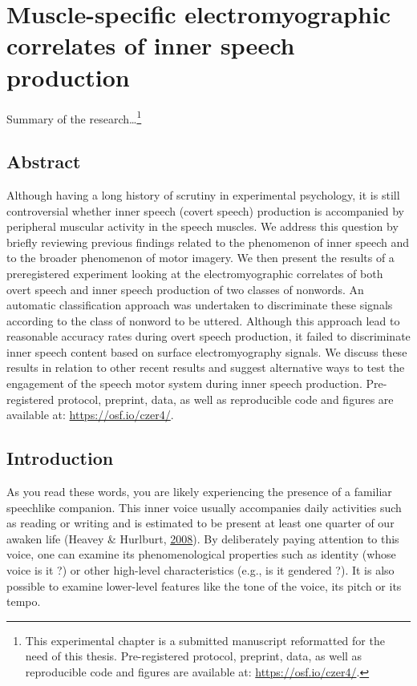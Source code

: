 \documentclass[a4paper,12pt,twoside,openright,oldfontcommands]{memoir}
\let\rmarkdownfootnote\footnote%
\def\footnote{\protect\rmarkdownfootnote}
\begin{document}
\hypertarget{muscle-specific-electromyographic-correlates-of-inner-speech-production}{%
\chapter{Muscle-specific electromyographic correlates of inner speech production}\label{muscle-specific-electromyographic-correlates-of-inner-speech-production}}

Summary of the research\ldots{}\footnote{This experimental chapter is a submitted manuscript reformatted for the need of this thesis. Pre-registered protocol, preprint, data, as well as reproducible code and figures are available at: \url{https://osf.io/czer4/}.}

\hypertarget{abstract-2}{%
\section{Abstract}\label{abstract-2}}

Although having a long history of scrutiny in experimental psychology, it is still controversial whether inner speech (covert speech) production is accompanied by peripheral muscular activity in the speech muscles. We address this question by briefly reviewing previous findings related to the phenomenon of inner speech and to the broader phenomenon of motor imagery. We then present the results of a preregistered experiment looking at the electromyographic correlates of both overt speech and inner speech production of two classes of nonwords. An automatic classification approach was undertaken to discriminate these signals according to the class of nonword to be uttered. Although this approach lead to reasonable accuracy rates during overt speech production, it failed to discriminate inner speech content based on surface electromyography signals. We discuss these results in relation to other recent results and suggest alternative ways to test the engagement of the speech motor system during inner speech production. Pre-registered protocol, preprint, data, as well as reproducible code and figures are available at: \url{https://osf.io/czer4/}.

\hypertarget{introduction-2}{%
\section{Introduction}\label{introduction-2}}

As you read these words, you are likely experiencing the presence of a familiar speechlike companion. This inner voice usually accompanies daily activities such as reading or writing and is estimated to be present at least one quarter of our awaken life (Heavey \& Hurlburt, \protect\hyperlink{ref-heavey_phenomena_2008}{2008}). By deliberately paying attention to this voice, one can examine its phenomenological properties such as identity (whose voice is it ?) or other high-level characteristics (e.g., is it gendered ?). It is also possible to examine lower-level features like the tone of the voice, its pitch or its tempo.
\end{document}
